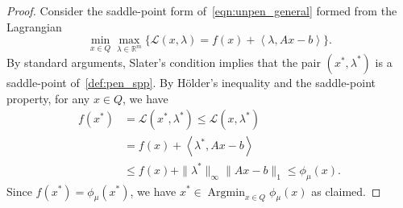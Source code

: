 \documentclass[10pt]{article}
\newcommand{\R}{\mathbb{R}}
\DeclareMathOperator*{\Argmin}{Argmin}
\newcommand{\inner}[2]{\left\langle #1,#2\right\rangle}
\theoremstyle{plain}
\theoremstyle{definition}
\theoremstyle{remark}
\begin{document}
\begin{proof}
    Consider the saddle-point form of~\eqref{eqn:unpen_general} formed from the Lagrangian
    \begin{equation}\label{def:pen_spp}
         \min_{x\in Q}\max_{\lambda\in \R^m}\{\mathcal{L}(x,\lambda)= f(x)+\inner{\lambda}{Ax-b}\}.
    \end{equation}
    By standard arguments, Slater's condition implies that the pair $(x^*,\lambda^*)$ is a saddle-point of~\eqref{def:pen_spp}. By Hölder's inequality and the saddle-point property, for any $x\in Q$, we have
    \begin{align*}
        f(x^*)&= \mathcal{L}(x^*,\lambda^*)\leq  \mathcal{L}(x,\lambda^*)\\
        &=f(x)+\inner{\lambda^*}{Ax-b}\\
        &\leq f(x)+\|\lambda^*\|_\infty\|Ax-b\|_1\leq \phi_\mu(x).
    \end{align*}
    Since $f(x^*)=\phi_\mu(x^*)$, we have $x^*\in\Argmin_{x\in Q}\phi_\mu(x)$ as claimed.
\end{proof}
\end{document}
